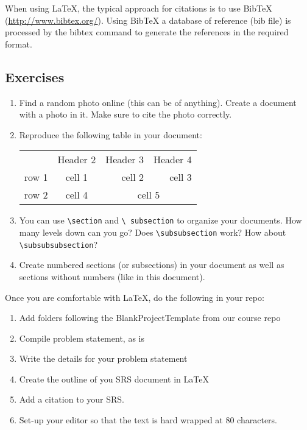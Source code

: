 \documentclass[12pt,fleqn]{article}
\newcommand{\be}{\begin{enumerate}}
\newcommand{\ee}{\end{enumerate}}
\begin{document}
When using LaTeX, the typical approach for citations is to use BibTeX
(\url{http://www.bibtex.org/}).  Using BibTeX a database of reference (bib file)
is processed by the bibtex command to generate the references in the required
format.

\subsection*{Exercises}
\be
\item Find a random photo online (this can be of anything). Create a document
  with a photo in it. Make sure to cite the photo correctly.
\item Reproduce the following table in your document:

\begin{tabular}{l|c||rr|}
\multicolumn{1}{l}{} & \multicolumn{1}{c}{Header 2} & \multicolumn{1}{r}{Header 3} & \multicolumn{1}{r}{Header 4} \\
\cline{2-4} \cline{2-4}
row 1 & cell 1 & cell 2 & cell 3 \\ \cline{2-4}
row 2 & cell 4 & \multicolumn{2}{c|}{ cell 5 } \\ \cline{2-4}
\end{tabular}

\item You can use \texttt{\textbackslash section} and \texttt{\textbackslash
    subsection} to organize your documents. How many levels down can you go?
  Does \texttt{\textbackslash subsubsection} work? How about
  \texttt{\textbackslash subsubsubsection}?
\item Create numbered sections (or subsections) in your document as well as
  sections without numbers (like in this document).  \ee

  Once you are comfortable with LaTeX, do the following in your
  repo: \be
\item Add folders following the BlankProjectTemplate from our course repo
\item Compile problem statement, as is
\item Write the details for your problem statement
\item Create the outline of you SRS document in LaTeX
\item Add a citation to your SRS.
\item Set-up your editor so that the text is hard wrapped at 80 characters.
\ee
\end{document}
